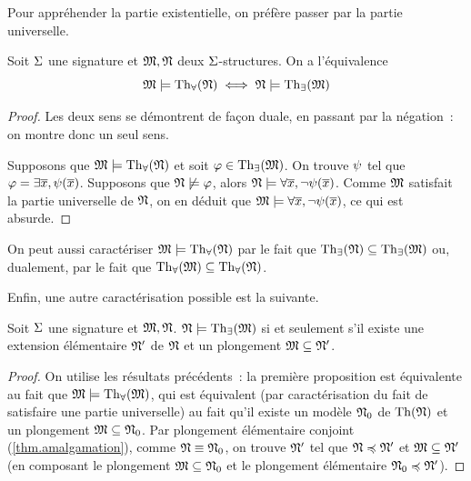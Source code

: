 \noindent
Pour appréhender la partie existentielle, on préfère passer par la partie
universelle.

\begin{proposition}
  Soit $\Sigma$ une signature et $\mathfrak{M},\mathfrak{N}$ deux $\Sigma$-structures. On a
  l'équivalence
  \[\mathfrak{M}\models\operatorname{Th}_{\forall}(\mathfrak{N})\iff \mathfrak{N}\models\operatorname{Th}_{\exists}(\mathfrak{M})\]
\end{proposition}

\begin{proof}
  Les deux sens se démontrent de façon duale, en passant par la négation~: on
  montre donc un seul sens.
  
  Supposons que $\mathfrak{M}\models\operatorname{Th}_{\forall}(\mathfrak{N})$ et soit
  $\varphi\in\operatorname{Th}_{\exists}(\mathfrak{M})$. On trouve $\psi$ tel que
  $\varphi = \exists \overline{x},\psi(\overline{x})$. Supposons que
  $\mathfrak{N}\not\models\varphi$, alors
  $\mathfrak{N}\models\forall\overline{x},\lnot\psi(\overline{x})$. Comme $\mathfrak{M}$
  satisfait la partie universelle de $\mathfrak{N}$, on en déduit que
  $\mathfrak{M}\models\forall \overline{x},\lnot\psi(\overline{x})$, ce qui est absurde.
\end{proof}

\begin{remark}
  On peut aussi caractériser $\mathfrak{M}\models\operatorname{Th}_{\forall}(\mathfrak{N})$ par le fait
  que $\operatorname{Th}_{\exists}(\mathfrak{N})\subseteq\operatorname{Th}_{\exists}(\mathfrak{M})$ ou, dualement,
  par le fait que $\operatorname{Th}_{\forall}(\mathfrak{M})\subseteq\operatorname{Th}_{\forall}(\mathfrak{N})$.
\end{remark}

\noindent
Enfin, une autre caractérisation possible est la suivante.

\begin{corollary}
  Soit $\Sigma$ une signature et $\mathfrak{M},\mathfrak{N}$.
  $\mathfrak{N}\models\operatorname{Th}_{\exists}(\mathfrak{M})$ si et seulement s'il existe une extension
  élémentaire $\mathfrak{N}'$ de $\mathfrak{N}$ et un plongement $\mathfrak{M}\subseteq\mathfrak{N}'$.
\end{corollary}

\begin{proof}
  On utilise les résultats précédents~: la première proposition est équivalente
  au fait que $\mathfrak{M}\models\operatorname{Th}_{\forall}(\mathfrak{M})$, qui est équivalent (par
  caractérisation du fait de satisfaire une partie universelle) au fait qu'il
  existe un modèle $\mathfrak{N}_0$ de $\operatorname{Th}(\mathfrak{N})$ et un plongement
  $\mathfrak{M}\subseteq\mathfrak{N}_0$. Par plongement élémentaire conjoint
  (\cref{thm.amalgamation}), comme $\mathfrak{N}\equiv\mathfrak{N}_0$, on trouve $\mathfrak{N}'$
  tel que $\mathfrak{N}\preccurlyeq\mathfrak{N}'$ et $\mathfrak{M}\subseteq\mathfrak{N}'$ (en composant le
  plongement $\mathfrak{M}\subseteq\mathfrak{N}_0$ et le plongement élémentaire
  $\mathfrak{N}_0\preccurlyeq\mathfrak{N}'$).
\end{proof}


